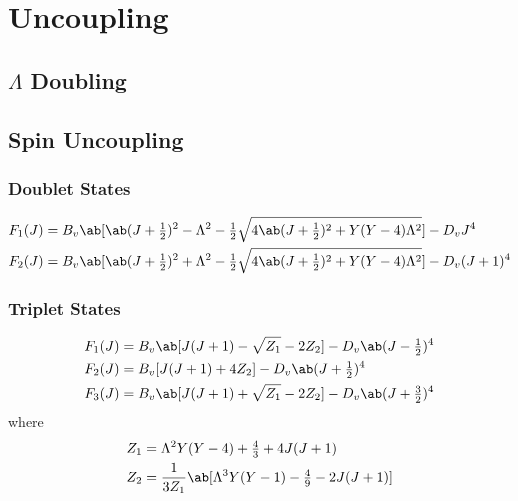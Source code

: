 \chapter{Uncoupling}
\label{c:uncoupling}

\section{\texorpdfstring{$\Lambda$}{Λ} Doubling}
\label{s:lambda_doubling}

\section{Spin Uncoupling}
\label{s:spin_uncoupling}

\subsection{Doublet States}

\begin{align*}
    F_1(J) &= B_v\ab[\ab(J + \tfrac{1}{2})^2 - \Lambda^2 - \tfrac{1}{2}\sqrt{4\ab(J + \tfrac{1}{2})^2 + Y(Y - 4)\Lambda^2}] - D_vJ^4 \\
    F_2(J) &= B_v\ab[\ab(J + \tfrac{1}{2})^2 + \Lambda^2 - \tfrac{1}{2}\sqrt{4\ab(J + \tfrac{1}{2})^2 + Y(Y - 4)\Lambda^2}] - D_v(J + 1)^4
\end{align*}

\subsection{Triplet States}

\begin{align*}
    F_1(J) &= B_v\ab[J(J + 1) - \sqrt{Z_1} - 2Z_2] - D_v\ab(J - \tfrac{1}{2})^4 \\
    F_2(J) &= B_v[J(J + 1) + 4Z_2] - D_v\ab(J + \tfrac{1}{2})^4                 \\
    F_3(J) &= B_v\ab[J(J + 1) + \sqrt{Z_1} - 2Z_2] - D_v\ab(J + \tfrac{3}{2})^4
\end{align*}
where
\begin{align*}
    Z_1 &= \Lambda^2Y(Y - 4) + \tfrac{4}{3} + 4J(J + 1) \\
    Z_2 &= \frac{1}{3Z_1}\ab[\Lambda^3Y(Y - 1) - \tfrac{4}{9} - 2J(J + 1)]
\end{align*}
